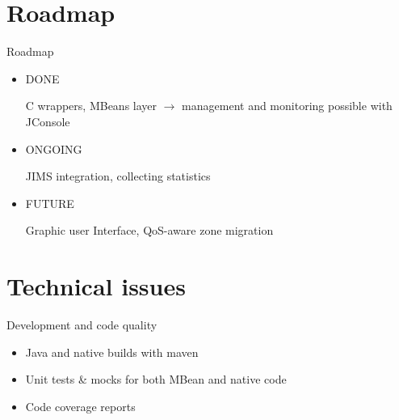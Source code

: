 \documentclass{beamer}
\begin{document}
\section{Roadmap}

	\begin{frame}{Roadmap}
		
		\begin{itemize}

			\item DONE
			
				C wrappers, MBeans layer $\rightarrow$ management and monitoring possible with JConsole

			\item ONGOING
			
				JIMS integration, collecting statistics

			\item FUTURE
			
				Graphic user Interface, QoS-aware zone migration

		\end{itemize}

	\end{frame}


\section{Technical issues}

	\begin{frame}{Development and code quality}

		\begin{itemize}
			\item Java and native builds with maven
			\item Unit tests \& mocks for both MBean and native code
			\item Code coverage reports
		\end{itemize}
	
	\end{frame}
\end{document}
